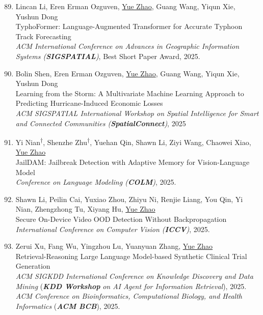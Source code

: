 \documentclass[margin,line,pifont,palatino,courier]{res}
\newcommand{\equalcontrib}{\textsuperscript{$\dagger$}}
\newenvironment{benumerate}[1]{
    \let\oldItem\item
    \def\item{\addtocounter{enumi}{-2}\oldItem}
    \begin{enumerate}[leftmargin=0.25in,label=\textcolor{uscred}{\arabic*.}]
    \setcounter{enumi}{#1}
    \addtocounter{enumi}{1}
}{
    \end{enumerate}
}
\begin{document}
\begin{resume}
\begin{benumerate}{88}
    \item Lincan Li, Eren Erman Ozguven, \underline{Yue Zhao}, Guang Wang, Yiqun Xie, Yushun Dong\\
    TyphoFormer: Language-Augmented Transformer for Accurate Typhoon Track Forecasting\\
    \textit{ACM International Conference on Advances in Geographic Information Systems (\textit{\textbf{SIGSPATIAL}})}, \textcolor{uscred}{\faAward \xspace Best Short Paper Award}, 2025.

    \item Bolin Shen, Eren Erman Ozguven, \underline{Yue Zhao}, Guang Wang, Yiqun Xie, Yushun Dong\\
    Learning from the Storm: A Multivariate Machine Learning Approach to Predicting Hurricane-Induced Economic Losses\\
    \textit{ACM SIGSPATIAL International Workshop on Spatial Intelligence for Smart and Connected Communities (\textit{\textbf{SpatialConnect}})}, 2025

    \item Yi Nian\equalcontrib, Shenzhe Zhu\equalcontrib, Yuehan Qin, Shawn Li, Ziyi Wang, Chaowei Xiao, \underline{Yue Zhao}\\
    JailDAM: Jailbreak Detection with Adaptive Memory for Vision-Language Model\\
    \textit{Conference on Language Modeling (\textbf{COLM})}, 2025.

    \item Shawn Li, Peilin Cai, Yuxiao Zhou, Zhiyu Ni, Renjie Liang, You Qin, Yi Nian, Zhengzhong Tu, Xiyang Hu, \underline{Yue Zhao}\\
    Secure On-Device Video OOD Detection Without Backpropagation\\
    \textit{International Conference on Computer Vision (\textbf{ICCV})}, 2025.

    \item Zerui Xu, Fang Wu, Yingzhou Lu, Yuanyuan Zhang, \underline{Yue Zhao} \\
    Retrieval-Reasoning Large Language Model-based Synthetic Clinical Trial Generation\\
    \textit{ACM SIGKDD International Conference on Knowledge Discovery and Data Mining} (\textbf{\textit{KDD Workshop}} \textit{on AI Agent for Information Retrieval}), 2025. \\
    \textit{ACM Conference on Bioinformatics, Computational Biology, and Health Informatics} (\textbf{\textit{ACM BCB}}), 2025.


\end{benumerate}
\end{resume}
\end{document}
